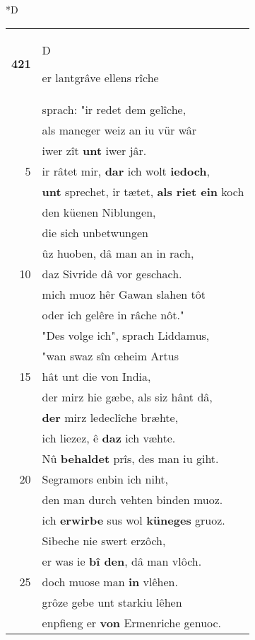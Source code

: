 \documentclass[8pt,a4paper,notitlepage]{article}
\begin{document}
\begin{table}[ht]
\begin{minipage}[t]{0.5\linewidth}
\small
\begin{center}*D
\end{center}
\begin{tabular}{rl}
\textbf{421} & \begin{large}D\end{large}er lantgrâve ellens rîche\\ 
 & sprach: "ir redet dem gelîche,\\ 
 & als maneger weiz an iu vür wâr\\ 
 & iwer zît \textbf{unt} iwer jâr.\\ 
5 & ir râtet mir, \textbf{dar} ich wolt \textbf{iedoch},\\ 
 & \textbf{unt} sprechet, ir tætet, \textbf{als riet ein} koch\\ 
 & den küenen Niblungen,\\ 
 & die sich unbetwungen\\ 
 & ûz huoben, dâ man an in rach,\\ 
10 & daz Sivride dâ vor geschach.\\ 
 & mich muoz hêr Gawan slahen tôt\\ 
 & oder ich gelêre in râche nôt."\\ 
 & "Des volge ich", sprach Liddamus,\\ 
 & "wan swaz sîn œheim Artus\\ 
15 & hât unt die von India,\\ 
 & der mirz hie gæbe, als siz hânt dâ,\\ 
 & \textbf{der} mirz ledeclîche bræhte,\\ 
 & ich liezez, ê \textbf{daz} ich væhte.\\ 
 & Nû \textbf{behaldet} prîs, des man iu giht.\\ 
20 & Segramors enbin ich niht,\\ 
 & den man durch vehten binden muoz.\\ 
 & ich \textbf{erwirbe} sus wol \textbf{küneges} gruoz.\\ 
 & Sibeche nie swert erzôch,\\ 
 & er was ie \textbf{bî den}, dâ man vlôch.\\ 
25 & doch muose man \textbf{in} vlêhen.\\ 
 & grôze gebe unt starkiu lêhen\\ 
 & enpfieng er \textbf{von} Ermenriche genuoc.\\ 

\end{tabular}
\end{minipage}
\end{table}
\end{document}
